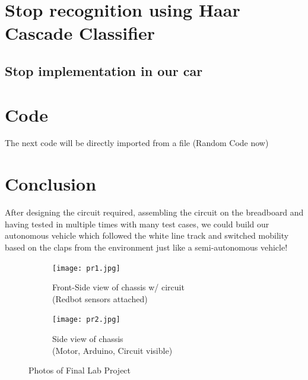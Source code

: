 \documentclass[12pt,a4paper]{article}
\begin{document}
\begin{large}
\section{Stop recognition using Haar Cascade Classifier}

\subsection{}

\subsection{}

\subsection{}

\subsection{Stop implementation in our car}


\section{Code}

The next code will be directly imported from a file (Random Code now)



\section{Conclusion}
After designing the circuit required, assembling the circuit on the breadboard and having tested in multiple times with many test cases, we could build our autonomous vehicle which followed the white line track and switched mobility based on the claps from the environment just like a semi-autonomous vehicle! \\
\begin{figure}[!hbp]
\centering
  \begin{subfigure}[b]{0.4\textwidth}
  \centering
  \captionsetup{justification=centering}
    \texttt{[image: pr1.jpg]}
    \caption{Front-Side view of chassis w/ circuit\\ (Redbot sensors attached)}
    \label{fig:g1}
  \end{subfigure}
  \hspace{1cm}
  \begin{subfigure}[b]{0.4\textwidth}
  \centering
  \captionsetup{justification=centering}
    \texttt{[image: pr2.jpg]}
    \caption{Side view of chassis \\(Motor, Arduino, Circuit visible)}
    \label{fig:g2}
  \end{subfigure}
  \caption{Photos of Final Lab Project}
\end{figure}


\end{large}
\end{document}
